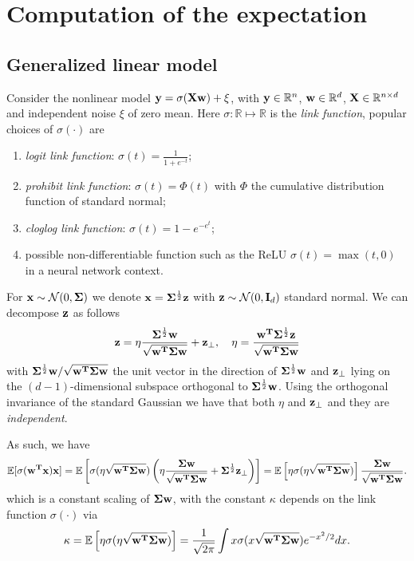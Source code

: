 \documentclass[11pt]{article}
\begin{document}
\section{Computation of the expectation}

\subsection{Generalized linear model}

Consider the nonlinear model $\mathbf y = \sigma(\mathbf X \mathbf w) + \xi$, with $\mathbf y \in \mathbb R^n$, $\mathbf w \in \mathbb R^d$, $\mathbf X \in \mathbb R^{n \times d}$ and independent noise $\xi$ of zero mean. Here $\sigma: \mathbb R \mapsto \mathbb R$ is the \emph{link function}, popular choices of $\sigma(\cdot)$ are
\begin{enumerate}
  \item \emph{logit link function}: $\sigma(t) = \frac1{ 1 + e^{-t} }$;
  \item \emph{prohibit link function}: $\sigma(t) = \Phi(t)$ with $\Phi$ the cumulative distribution function of standard normal;
  \item \emph{cloglog link function}: $\sigma(t) = 1 - e^{-e^t}$;
  \item possible non-differentiable function such as the ReLU $\sigma(t) = \max(t,0)$ in a neural network context.
\end{enumerate}


For $\mathbf x \sim \mathcal{N}(0, \mathbf{\Sigma})$ we denote $\mathbf x = \mathbf{\Sigma}^{\frac12} \mathbf z$ with $\mathbf z \sim \mathcal{N}(0, \mathbf I_d)$ standard normal. We can decompose $\mathbf z$ as follows
\[
  \mathbf z = \eta \frac{\mathbf{\Sigma}^{\frac12} \mathbf w}{ \sqrt{\mathbf w^{\mathbf{T}} \mathbf{\Sigma} \mathbf w} } + \mathbf z_\perp, \quad \eta = \frac{\mathbf w^{\mathbf{T}} \mathbf{\Sigma}^{\frac12} \mathbf z}{ \sqrt{\mathbf w^{\mathbf{T}} \mathbf{\Sigma} \mathbf w} }
\]
with $\mathbf{\Sigma}^{\frac12} \mathbf w/\sqrt{\mathbf w^{\mathbf{T}} \mathbf{\Sigma} \mathbf w}$ the unit vector in the direction of $\mathbf{\Sigma}^{\frac12} \mathbf w$ and $\mathbf z_\perp$ lying on the $(d-1)$-dimensional subspace orthogonal to $\mathbf{\Sigma}^{\frac12} \mathbf w$. Using the orthogonal invariance of the standard Gaussian we have  that both $\eta$ and $\mathbf z_\perp$ and they are \emph{independent}.

As such, we have
\[
  \mathbb E[ \sigma(\mathbf w^{\mathbf{T}} \mathbf x) \mathbf x ] = \mathbb E \left[ \sigma(\eta \sqrt{\mathbf w^{\mathbf{T}} \mathbf{\Sigma} \mathbf w} ) \left( \eta \frac{\mathbf{\Sigma} \mathbf w}{ \sqrt{\mathbf w^{\mathbf{T}} \mathbf{\Sigma} \mathbf w} } + \mathbf{\Sigma}^{\frac12} \mathbf z_\perp \right) \right] = \mathbb E \left[ \eta \sigma(\eta \sqrt{\mathbf w^{\mathbf{T}} \mathbf{\Sigma} \mathbf w} ) \right] \frac{\mathbf{\Sigma} \mathbf w}{ \sqrt{\mathbf w^{\mathbf{T}} \mathbf{\Sigma} \mathbf w} }.
\]
which is a constant scaling of $\mathbf{\Sigma} \mathbf w$, with the constant $\kappa$ depends on the link function $\sigma(\cdot)$ via
\[
  \kappa = \mathbb E \left[ \eta \sigma(\eta \sqrt{\mathbf w^{\mathbf{T}} \mathbf{\Sigma} \mathbf w} ) \right] = \frac1{\sqrt{2 \pi}} \int x \sigma(x \sqrt{\mathbf w^{\mathbf{T}} \mathbf{\Sigma} \mathbf w}) e^{-x^2/2} dx.
\]
\end{document}
